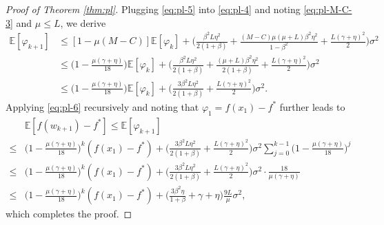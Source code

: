 \documentclass[10pt]{article}
\numberwithin{equation}{section}
\theoremstyle{definition}
\newcommand{\ebb}{\mathbb{E}}  %
\begin{document}
\begin{proof}[Proof of Theorem \ref{thm:pl}]
Plugging \eqref{eq:pl-5} into \eqref{eq:pl-4} and noting \eqref{eq:pl-M-C-3} and $\mu\leq L$, we derive
\begin{equation}\label{eq:pl-6}
\begin{aligned}
\ebb[\varphi_{k+1}] & \leq[1-\mu(M-C)] \ebb[\varphi_k]+\Big(\frac{\beta^2 L \eta^2}{2(1+\beta)}+\frac{(M-C) \mu(\mu+L) \beta^2 \eta^2}{1-\beta^2}+\frac{L(\gamma+\eta)^2}{2}\Big) \sigma^2 \\
& \leq\Big(1-\frac{\mu(\gamma+\eta)}{18}\Big) \ebb[\varphi_k]+\Big(\frac{\beta^2 L \eta^2}{2(1+\beta)}+\frac{(\mu+L) \beta^2 \eta^2}{2(1+\beta)}+\frac{L(\gamma+\eta)^2}{2}\Big) \sigma^2 \\
& \leq\Big(1-\frac{\mu(\gamma+\eta)}{18}\Big) \ebb[\varphi_k]+\Big(\frac{3 \beta^2 L \eta^2}{2(1+\beta)}+\frac{L(\gamma+\eta)^2}{2}\Big) \sigma^2.
\end{aligned}
\end{equation}
Applying \eqref{eq:pl-6} recursively and noting that $\varphi_1=f(x_1)-f^*$ further leads to
\begin{equation*}
\begin{aligned}
&\ebb[f(w_{k+1})-f^*]\leq\ebb[\varphi_{k+1}]\\
\leq & \Big(1-\frac{\mu(\gamma+\eta)}{18}\Big)^k(f(x_1)-f^*)+\Big(\frac{3 \beta^2 L \eta^2}{2(1+\beta)}+\frac{L(\gamma+\eta)^2}{2}\Big) \sigma^2 \sum_{j=0}^{k-1}\Big(1-\frac{\mu(\gamma+\eta)}{18}\Big)^j \\
\leq & \Big(1-\frac{\mu(\gamma+\eta)}{18}\Big)^k(f(x_1)-f^*)+\Big(\frac{3 \beta^2 L \eta^2}{2(1+\beta)}+\frac{L(\gamma+\eta)^2}{2}\Big) \sigma^2 \cdot \frac{18}{\mu(\gamma+\eta)} \\
\leq & \Big(1-\frac{\mu(\gamma+\eta)}{18}\Big)^k(f(x_1)-f^*)+\Big(\frac{3 \beta^2 \eta}{1+\beta}+\gamma+\eta\Big) \frac{9L}{\mu} \sigma^2,
\end{aligned}
\end{equation*}
which completes the proof.
\end{proof}
\end{document}
